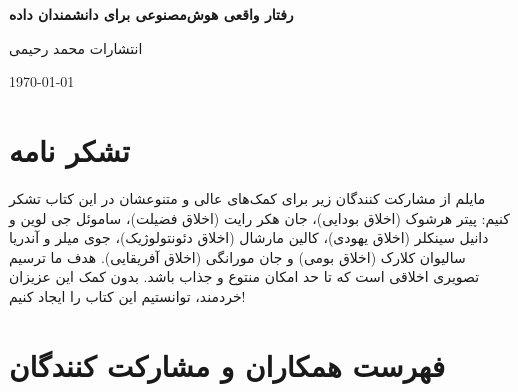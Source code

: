 \documentclass[10pt,oneside]{book}
\begin{document}
    \frontmatter

    \begin{titlepage}
        \begin{center}
            \vspace*{1cm}

            {\huge \textbf{رفتار واقعی هوش‌مصنوعی برای دانشمندان داده}}

            \vspace{0.5cm}


            \LARGE انتشارات محمد رحیمی

            \large{\today}

        \end{center}
    \end{titlepage}

    \tableofcontents

    \newpage

    \section*{تشکر نامه}
    \begin{spacing}{1.5}
        مایلم از مشارکت کنندگان زیر برای کمک‌های عالی و متنوعشان در این کتاب تشکر کنیم: پیتر هرشوک (اخلاق بودایی)، جان هکر رایت (اخلاق فضیلت)، ساموئل جی لوین و دانیل سینکلر (اخلاق یهودی)، کالین مارشال (اخلاق دئونتولوژیک)، جوی میلر و آندریا سالیوان کلارک (اخلاق بومی) و جان مورانگی (اخلاق آفریقایی).
        هدف ما ترسیم تصویری اخلاقی است که تا حد امکان منتوع و جذاب باشد.
        بدون کمک این عزیزان خردمند، توانستیم این کتاب را ایجاد کنیم!
    \end{spacing}

    \newpage

    \section*{فهرست همکاران و مشارکت کنندگان}
\end{document}
